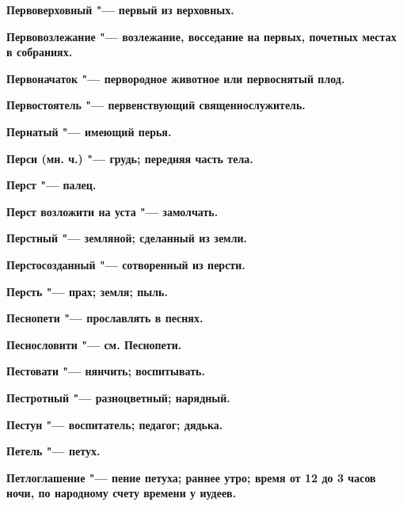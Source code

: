 \begin{multicols}{2}
\bfseries Первоверховный\normalfont{} "--- первый из верховных. 




\bfseries Первовозлежание\normalfont{} "--- возлежание, восседание на первых, почетных местах в собраниях. 




\bfseries Первоначаток\normalfont{} "--- первородное животное или первоснятый плод. 




\bfseries Первостоятель\normalfont{} "--- первенствующий священнослужитель. 




\bfseries Пернатый\normalfont{} "--- имеющий перья. 




\bfseries Перси\normalfont{} (мн. ч.) "--- грудь; передняя часть тела. 




\bfseries Перст\normalfont{} "--- палец. 




\bfseries Перст возложити на уста\normalfont{} "--- замолчать. 




\bfseries Перстный\normalfont{} "--- земляной; сделанный из земли. 




\bfseries Перстосозданный\normalfont{} "--- сотворенный из персти. 




\bfseries Персть\normalfont{} "--- прах; земля; пыль. 




\bfseries Песнопети\normalfont{} "--- прославлять в песнях. 




\bfseries Песнословити\normalfont{} "--- см. Песнопети. 




\bfseries Пестовати\normalfont{} "--- нянчить; воспитывать. 




\bfseries Пестротный\normalfont{} "--- разноцветный; нарядный. 




\bfseries Пестун\normalfont{} "--- воспитатель; педагог; дядька. 




\bfseries Петель\normalfont{} "--- петух. 




\bfseries Петлоглашение\normalfont{} "--- пение петуха; раннее утро; время от 12 до 3 часов ночи, по народному счету времени у иудеев. 





\end{multicols}
